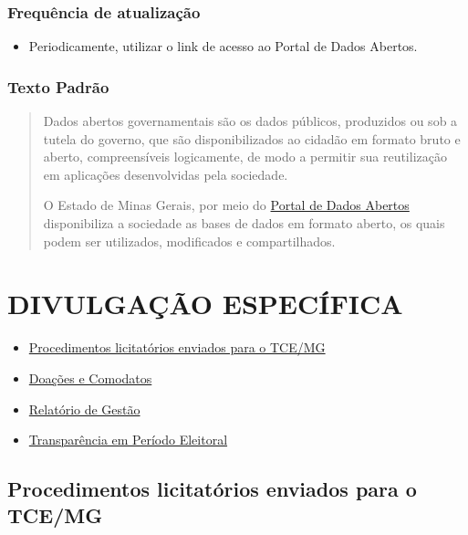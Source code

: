 \documentclass[
]{book}
\providecommand{\tightlist}{%
  \setlength{\itemsep}{0pt}\setlength{\parskip}{0pt}}
\begin{document}
\hypertarget{frequuxeancia-de-atualizauxe7uxe3o-9}{%
\subsection{Frequência de atualização}\label{frequuxeancia-de-atualizauxe7uxe3o-9}}

\begin{itemize}
\tightlist
\item
  Periodicamente, utilizar o link de acesso ao Portal de Dados Abertos.
\end{itemize}

\hypertarget{texto-padruxe3o-10}{%
\subsection{Texto Padrão}\label{texto-padruxe3o-10}}

\begin{quote}
Dados abertos governamentais são os dados públicos, produzidos ou sob a tutela do governo, que são disponibilizados ao cidadão em formato bruto e aberto, compreensíveis logicamente, de modo a permitir sua reutilização em aplicações desenvolvidas pela sociedade.

O Estado de Minas Gerais, por meio do \href{http://dados.mg.gov.br/}{Portal de Dados Abertos} disponibiliza a sociedade as bases de dados em formato aberto, os quais podem ser utilizados, modificados e compartilhados.
\end{quote}

\hypertarget{divulgauxe7uxe3o-especuxedfica}{%
\chapter{DIVULGAÇÃO ESPECÍFICA}\label{divulgauxe7uxe3o-especuxedfica}}

\begin{itemize}
\tightlist
\item
  \href{tce.html}{Procedimentos licitatórios enviados para o TCE/MG}
\item
  \href{doacoes.html}{Doações e Comodatos}
\item
  \href{relatorio-gestao.html}{Relatório de Gestão}
\item
  \href{periodo-eleitoral.html}{Transparência em Período Eleitoral}
\end{itemize}

\hypertarget{procedimentos-licitatuxf3rios-enviados-para-o-tcemg}{%
\section{Procedimentos licitatórios enviados para o TCE/MG}\label{procedimentos-licitatuxf3rios-enviados-para-o-tcemg}}
\end{document}
